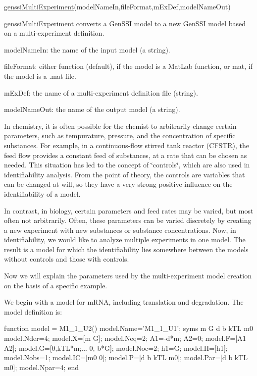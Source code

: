 \begin{DoxyCode}
\hyperlink{genssi_multi_experiment_8m_a99c14a4d68fa9a17610a21cc6ead7e30}{genssiMultiExperiment}(modelNameIn,fileFormat,mExDef,modelNameOut) 
\end{DoxyCode}


genssi\+Multi\+Experiment converts a Gen\+S\+SI model to a new Gen\+S\+SI model based on a multi-\/experiment definition.

model\+Name\+In\+: the name of the input model (a string).

file\+Format\+: either \textquotesingle{}function\textquotesingle{} (default), if the model is a Mat\+Lab function, or \textquotesingle{}mat\textquotesingle{}, if the model is a .mat file.

m\+Ex\+Def\+: the name of a multi-\/experiment definition file (string).

model\+Name\+Out\+: the name of the output model (a string).

In chemistry, it is often possible for the chemist to arbitrarily change certain parameters, such as tempurature, pressure, and the concentration of specific substances. For example, in a continuous-\/flow stirred tank reactor (C\+F\+S\+TR), the feed flow provides a constant feed of substances, at a rate that can be chosen as needed. This situation has led to the concept of \char`\"{}controls\char`\"{}, which are also used in identifiability analysis. From the point of theory, the controls are variables that can be changed at will, so they have a very strong positive influence on the identifiability of a model.

In contrast, in biology, certain parameters and feed rates may be varied, but most often not arbitrarily. Often, these parameters can be varied discretely by creating a new experiment with new substances or substance concentrations. Now, in identifiability, we would like to analyze multiple experiments in one model. The result is a model for which the identifiability lies somewhere between the models without controls and those with controls.

Now we will explain the parameters used by the multi-\/experiment model creation on the basis of a specific example.

We begin with a model for m\+R\+NA, including translation and degradation. The model definition is\+:


\begin{DoxyCode}
\textcolor{keyword}{function} model = M1\_1\_U2()
    model.Name='M1\_1\_U1';
    syms  m G d b kTL m0
    model.Nder=4;
    model.X=[m G];
    model.Neq=2;
    A1=-d*m;
    A2=0;
    model.F=[A1 A2];
    model.G=[0,kTL*m;...
             0,-b*G];
    model.Noc=2;
    h1=G;
    model.H=[h1];
    model.Nobs=1;
    model.IC=[m0 0];
    model.P=[d b kTL m0];
    model.Par=[d b kTL m0];
    model.Npar=4;
end
\end{DoxyCode}


